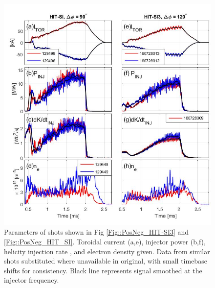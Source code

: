 \begin{figure}
\includegraphics[width=6in]{Jscope5.jpg}\caption{Parameters of shots shown in Fig \ref{Fig::PosNeg_HIT-SI3} and \ref{Fig::PosNeg_HIT_SI}. Toroidal current (a,e), injector power (b,f), helicity injection rate , and electron density given. Data from similar shots substituted where unavailable in original, with small timebase shifts for consistency. Black line represents signal smoothed at the injector frequency.}\label{Fig::Jscope}
\end{figure}

